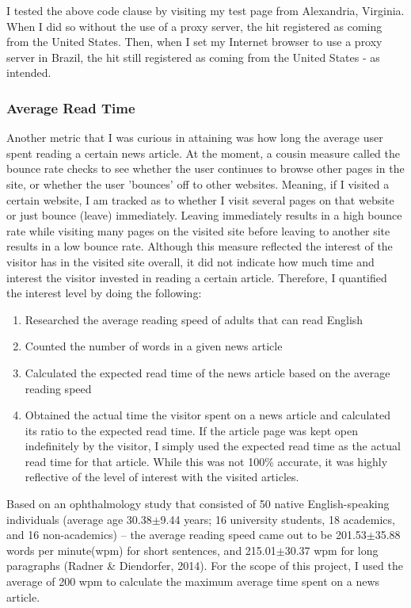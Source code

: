 \documentclass[12pt]{article}
\begin{document}
I tested the above code clause by visiting my test page from Alexandria, Virginia. When I did so without the use of a proxy server, the hit registered as coming from the United States. Then, when I set my Internet browser to use a proxy server in Brazil, the hit still registered as coming from the United States - as intended.

\subsubsection{Average Read Time}

Another metric that I was curious in attaining was how long the average user spent reading a certain news article. At the moment, a cousin measure called the bounce rate checks to see whether the user continues to browse other pages in the site, or whether the user 'bounces' off to other websites. Meaning, if I visited a certain website, I am tracked as to whether I visit several pages on that website or just bounce (leave) immediately. Leaving immediately results in a high bounce rate while visiting many pages on the visited site before leaving to another site results in a low bounce rate. 
Although this measure reflected the interest of the visitor has in the visited site overall, it did not indicate how much time and interest the visitor invested in reading a certain article. Therefore, I quantified the interest level by doing the following:
\begin{enumerate}
\item Researched the average reading speed of adults that can read English
\item Counted the number of words in a given news article
\item Calculated the expected read time of the news article based on the average reading speed
\item Obtained the actual time the visitor spent on a news article and calculated its ratio to the expected read time. If the article page was kept open indefinitely by the visitor, I simply used the expected read time as the actual read time for that article. While this was not 100\% accurate, it was highly reflective of the level of interest with the visited articles.
\end{enumerate}     

\noindent Based on an ophthalmology study that consisted of 50 native English-speaking individuals (average age 30.38$\pm$9.44 years; 16 university students, 18 academics, and 16 non-academics) -- the average reading speed came out to be 201.53$\pm$35.88 words per minute(wpm) for short sentences, and 215.01$\pm$30.37 wpm for long paragraphs (Radner \& Diendorfer, 2014). For the scope of this project, I used the average of 200 wpm to calculate the maximum average time spent on a news article.  
\end{document}
